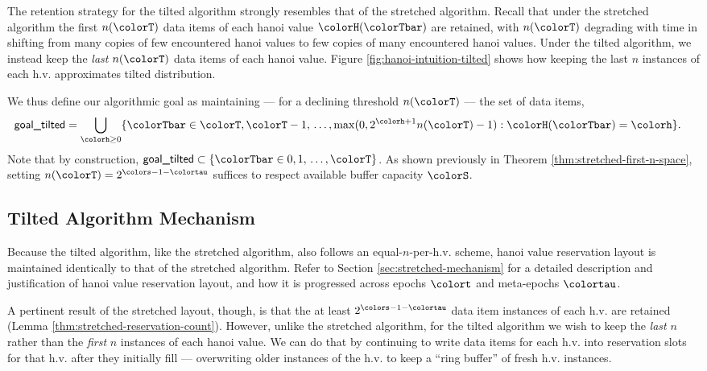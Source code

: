 

The retention strategy for the tilted algorithm strongly resembles that of the stretched algorithm.
Recall that under the stretched algorithm the first $n(\colorT)$ data items of each hanoi value $\colorH(\colorTbar)$ are retained, with $n(\colorT)$ degrading with time in shifting from many copies of few encountered hanoi values to few copies of many encountered hanoi values.
Under the tilted algorithm, we instead keep the \textit{last} $n(\colorT)$ data items of each hanoi value.
Figure \ref{fig:hanoi-intuition-tilted} shows how keeping the last $n$ instances of each h.v. approximates tilted distribution.

We thus define our algorithmic goal as maintaining --- for a declining threshold $n(\colorT)$ --- the set of data items,
\begin{align*}
\textsf{goal\_tilted}
&=
\bigcup_{\colorh \geq 0}
\{ \colorTbar \in \colorT, \colorT - 1, \, \ldots, \max(0, 2^{\colorh + 1}n(\colorT) - 1) : \colorH(\colorTbar) = \colorh \}.
\end{align*}
Note that by construction, $\textsf{goal\_tilted} \subset \{ \colorTbar \in 0, 1, \, \ldots, \colorT \}$.
As shown previously in Theorem \ref{thm:stretched-first-n-space}, setting $n(\colorT) = 2^{\colors - 1 - \colortau}$ suffices to respect available buffer capacity $\colorS$.

\subsection{Tilted Algorithm Mechanism}
\label{sec:tilted-mechanism}

Because the tilted algorithm, like the stretched algorithm, also follows an equal-$n$-per-h.v. scheme, hanoi value reservation layout is maintained identically to that of the stretched algorithm.
Refer to Section \ref{sec:stretched-mechanism} for a detailed description and justification of hanoi value reservation layout, and how it is progressed across epochs $\colort$ and meta-epochs $\colortau$.

A pertinent result of the stretched layout, though, is that the at least $2^{\colors - 1 - \colortau}$ data item instances of each h.v. are retained (Lemma \ref{thm:stretched-reservation-count}).
However, unlike the stretched algorithm, for the tilted algorithm we wish to keep the \textit{last} $n$ rather than the \textit{first} $n$ instances of each hanoi value.
We can do that by continuing to write data items for each h.v. into reservation slots for that h.v. after they initially fill --- overwriting older instances of the h.v. to keep a ``ring buffer'' of fresh h.v. instances.

